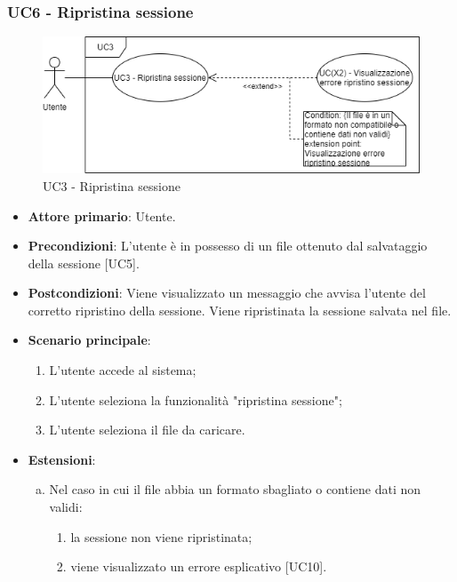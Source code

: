 \subsubsection{UC6 - Ripristina sessione}
\begin{figure}[h]
\includegraphics[width=\linewidth]{section/Images/UC3RipristinaSessione.png}
\centering
\caption{UC3 - Ripristina sessione}
\end{figure}
\begin{itemize}
	\item \textbf{Attore primario}: Utente.
	\item \textbf{Precondizioni}: L'utente è in possesso di un file ottenuto dal salvataggio della sessione [UC5].
	\item \textbf{Postcondizioni}: Viene visualizzato un messaggio che avvisa l'utente del corretto ripristino della sessione. Viene ripristinata la sessione salvata nel file.
	\item \textbf{Scenario principale}:
		\begin{enumerate}
			\item L'utente accede al sistema;
			\item L'utente seleziona la funzionalità "ripristina sessione";
			\item L'utente seleziona il file da caricare.
		\end{enumerate}
	\item \textbf{Estensioni}:
	\begin{enumerate}[(a)]
		\item Nel caso in cui il file abbia un formato sbagliato o contiene dati non validi:
		\begin{enumerate}[1.]
			\item la sessione non viene ripristinata;
			\item viene visualizzato un errore esplicativo [UC10].
		\end{enumerate}
	\end{enumerate}
\end{itemize}